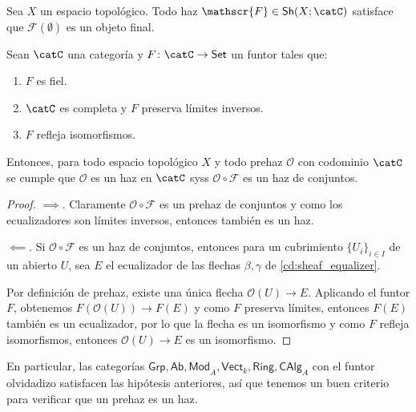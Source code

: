 \begin{prop}
	Sea $X$ un espacio topológico.
	Todo haz $\mathscr{F} \in \mathsf{Sh}(X; \catC)$ satisface que $\mathscr{F}(\emptyset)$ es un objeto final.
\end{prop}

\begin{prop}
	Sean $\catC$ una categoría y $F \colon \catC \to \mathsf{Set}$ un funtor tales que:
	\begin{enumerate}
		\item $F$ es fiel.
		\item $\catC$ es completa y $F$ preserva límites inversos.
		\item $F$ refleja isomorfismos.
	\end{enumerate}
	Entonces, para todo espacio topológico $X$ y todo prehaz $\mathscr{O}$ con codominio $\catC$ se cumple
	que $\mathscr{O}$ es un haz en $\catC$ syss $\mathscr{O \circ F}$ es un haz de conjuntos.
\end{prop}
\begin{proof}
	$\implies$. Claramente $\mathscr{O \circ F}$ es un prehaz de conjuntos y como los ecualizadores son límites inversos, entonces también es un haz.

	$\impliedby$. Si $\mathscr{O \circ F}$ es un haz de conjuntos, entonces para un cubrimiento $\{ U_i \}_{i\in I}$ de un abierto $U$,
	sea $E$ el ecualizador de las flechas $\beta, \gamma$ de \eqref{cd:sheaf_equalizer}.

	Por definición de prehaz, existe una única flecha $\mathscr{O}(U) \to E$.
	Aplicando el funtor $F$, obtenemos $F(\mathscr{O}(U)) \to F(E)$ y como $F$ preserva límites, entonces $F(E)$ también es un ecualizador,
	por lo que la flecha es un isomorfismo y como $F$ refleja isomorfismos, entonces $\mathscr{O}(U) \to E$ es un isomorfismo.
\end{proof}
En particular, las categorías $\mathsf{Grp, Ab, Mod}_A, \mathsf{Vect}_k, \mathsf{Ring, CAlg}_A$ con el funtor olvidadizo satisfacen las hipótesis anteriores,
así que tenemos un buen criterio para verificar que un prehaz es un haz.

